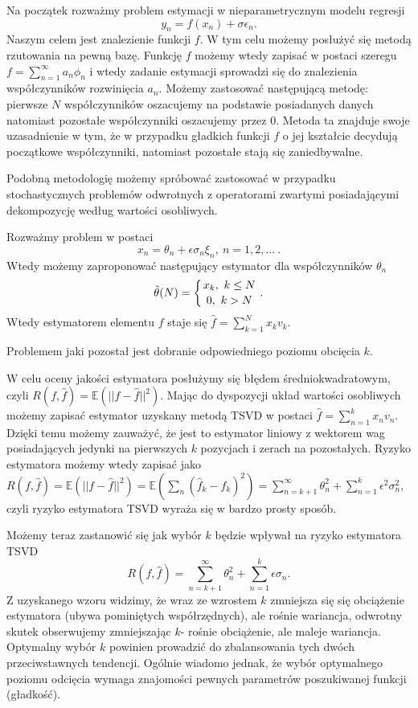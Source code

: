 \documentclass[10pt]{mwart}
\begin{document}
Na początek rozważmy problem estymacji w nieparametrycznym modelu regresji
\begin{displaymath}
y_n=f(x_n)+\sigma\epsilon_n.
\end{displaymath}
Naszym celem jest znalezienie funkcji $f$. W tym celu możemy posłużyć się metodą rzutowania na pewną bazę. Funkcję $f$ możemy wtedy zapisać w postaci szeregu $f=\sum_{n=1}^{\infty}a_n\phi_n$ i wtedy zadanie estymacji sprowadzi się do znalezienia współczynników rozwinięcia $a_n$. Możemy zastosować następującą metodę: pierwsze $N$ współczynników oszacujemy na podstawie posiadanych danych natomiast pozostałe współczynniki oszacujemy przez $0$. Metoda ta znajduje swoje uzasadnienie w tym, że w przypadku gładkich funkcji $f$ o jej kształcie decydują początkowe współczynniki, natomiast pozostałe stają się zaniedbywalne. 

Podobną metodologię możemy spróbować zastosować w przypadku stochastycznych problemów odwrotnych z operatorami zwartymi posiadającymi dekompozycję według wartości osobliwych.

Rozważmy problem w postaci 
\begin{displaymath}
x_n=\theta_n+\epsilon\sigma_n\xi_n,\ n=1,2,\dots\ .
\end{displaymath}
Wtedy możemy zaproponować następujący estymator dla współczynników $\theta_n$
\begin{displaymath}
\hat{\theta}(N)=\left\{{x_k,\ k\leq N}\atop {0,\ k>N}\right. .
\end{displaymath}
Wtedy estymatorem elementu $f$ staje się $\hat{f}=\sum_{k=1}^Nx_kv_k$.

Problemem jaki pozostał jest dobranie odpowiedniego poziomu obcięcia $k$.

W celu oceny jakości estymatora posłużymy się błędem średniokwadratowym, czyli $R(f,\hat{f})=\mathbb{E}(||f-\hat{f}||^2)$. Mając do dyspozycji układ wartości osobliwych możemy zapisać estymator uzyskany metodą TSVD w postaci $\hat{f}=\sum_{n=1}^kx_nv_n$. Dzięki temu możemy zauważyć, że jest to estymator liniowy z wektorem wag posiadających jedynki na pierwszych $k$ pozycjach i zerach na pozostałych. Ryzyko estymatora możemy wtedy zapisać jako $R(f,\hat{f})=\mathbb{E}(||f-\hat{f}||^2)=\mathbb{E}(\sum_n(\hat{f}_k-f_k)^2)=\sum_{n=k+1}^{\infty}\theta_n^2+\sum_{n=1}^k\epsilon^2\sigma_n^2$, czyli ryzyko estymatora TSVD wyraża się w bardzo prosty sposób.

Możemy teraz zastanowić się jak wybór $k$ będzie wpływał na ryzyko estymatora TSVD
\begin{displaymath}
R(f,\hat{f})=\sum_{n=k+1}^{\infty}\theta_n^2+\sum_{n=1}^k\epsilon\sigma_n.
\end{displaymath}
Z uzyskanego wzoru widzimy, że wraz ze wzrostem $k$ zmniejsza się się obciążenie estymatora (ubywa pominiętych współrzędnych), ale rośnie wariancja, odwrotny skutek obserwujemy zmniejszając $k$- rośnie obciążenie, ale maleje wariancja. Optymalny wybór $k$ powinien prowadzić do zbalansowania tych dwóch przeciwstawnych tendencji. Ogólnie wiadomo jednak, że wybór optymalnego poziomu odcięcia wymaga znajomości pewnych parametrów poszukiwanej funkcji (gładkość).
\end{document}
